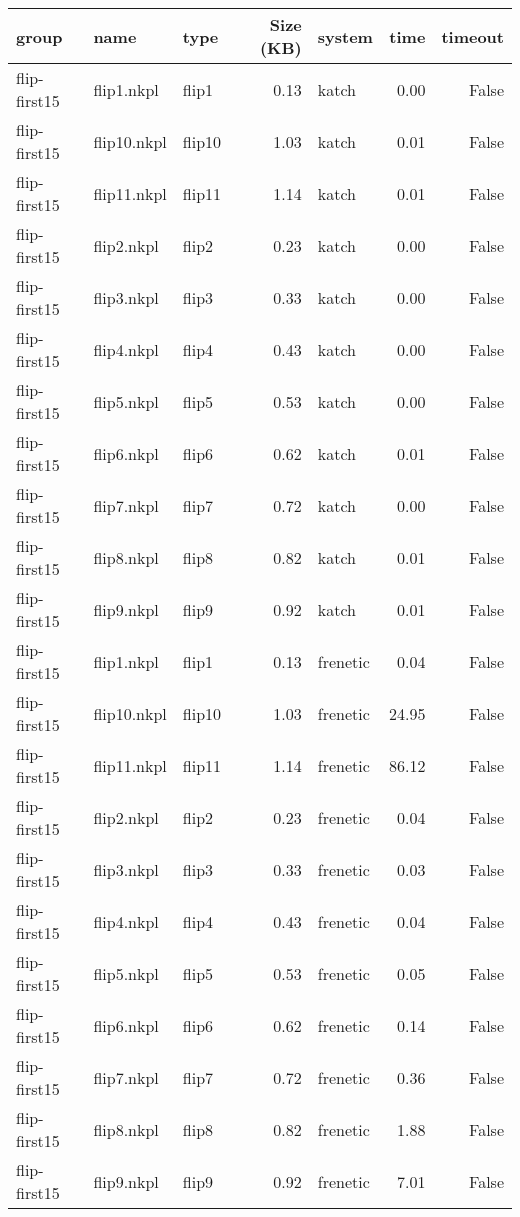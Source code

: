 \begin{tabular}{lllrlrr}
\toprule
group & name & type & Size (KB) & system & time & timeout \\
\midrule
flip-first15 & flip1.nkpl & flip1 & 0.13 & katch & 0.00 & False \\
flip-first15 & flip10.nkpl & flip10 & 1.03 & katch & 0.01 & False \\
flip-first15 & flip11.nkpl & flip11 & 1.14 & katch & 0.01 & False \\
flip-first15 & flip2.nkpl & flip2 & 0.23 & katch & 0.00 & False \\
flip-first15 & flip3.nkpl & flip3 & 0.33 & katch & 0.00 & False \\
flip-first15 & flip4.nkpl & flip4 & 0.43 & katch & 0.00 & False \\
flip-first15 & flip5.nkpl & flip5 & 0.53 & katch & 0.00 & False \\
flip-first15 & flip6.nkpl & flip6 & 0.62 & katch & 0.01 & False \\
flip-first15 & flip7.nkpl & flip7 & 0.72 & katch & 0.00 & False \\
flip-first15 & flip8.nkpl & flip8 & 0.82 & katch & 0.01 & False \\
flip-first15 & flip9.nkpl & flip9 & 0.92 & katch & 0.01 & False \\
flip-first15 & flip1.nkpl & flip1 & 0.13 & frenetic & 0.04 & False \\
flip-first15 & flip10.nkpl & flip10 & 1.03 & frenetic & 24.95 & False \\
flip-first15 & flip11.nkpl & flip11 & 1.14 & frenetic & 86.12 & False \\
flip-first15 & flip2.nkpl & flip2 & 0.23 & frenetic & 0.04 & False \\
flip-first15 & flip3.nkpl & flip3 & 0.33 & frenetic & 0.03 & False \\
flip-first15 & flip4.nkpl & flip4 & 0.43 & frenetic & 0.04 & False \\
flip-first15 & flip5.nkpl & flip5 & 0.53 & frenetic & 0.05 & False \\
flip-first15 & flip6.nkpl & flip6 & 0.62 & frenetic & 0.14 & False \\
flip-first15 & flip7.nkpl & flip7 & 0.72 & frenetic & 0.36 & False \\
flip-first15 & flip8.nkpl & flip8 & 0.82 & frenetic & 1.88 & False \\
flip-first15 & flip9.nkpl & flip9 & 0.92 & frenetic & 7.01 & False \\
\bottomrule
\end{tabular}
